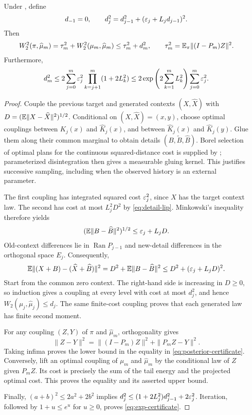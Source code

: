 \begin{theorem}\label{thm:posterior-certificate}
Under , define
\begin{equation}\label{eq:recurrence}
 d_{-1}=0,\qquad d_j^2=d_{j-1}^2+(\varepsilon_j+L_jd_{j-1})^2.
\end{equation}
Then
\begin{equation}\label{eq:posterior-certificate}
 W_2^2(\pi,\widehat\mu_m)
 =\tau_m^2+W_2^2(\mu_m,\widehat\mu_m)
 \le\tau_m^2+d_m^2,\qquad
 \tau_m^2=\mathbb E_\pi\|(I-P_m)Z\|^2.
\end{equation}
Furthermore,
\begin{equation}\label{eq:exp-certificate}
 d_m^2\le
 2\sum_{j=0}^m\varepsilon_j^2\prod_{k=j+1}^m(1+2L_k^2)
 \le2\exp\left(2\sum_{k=1}^mL_k^2\right)\sum_{j=0}^m\varepsilon_j^2.
\end{equation}
\end{theorem}
\begin{proof}
Couple the previous target and generated contexts $(X,\widehat X)$ with
$D=(\mathbb E\|X-\widehat X\|^2)^{1/2}$. Conditional on $(X,\widehat X)=(x,y)$, choose optimal couplings between $K_j(x)$ and $\widehat K_j(x)$, and between $\widehat K_j(x)$ and $\widehat K_j(y)$. Glue them along their common marginal to obtain details $(B,\widetilde B,\widehat B)$. Borel selection of optimal plans for the continuous squared-distance cost is supplied by \citet[Corollary~5.22]{villani2009}; parameterized disintegration then gives a measurable gluing kernel. This justifies successive sampling, including when the observed history is an external parameter.

The first coupling has integrated squared cost $\varepsilon_j^2$, since $X$ has the target context law. The second has cost at most $L_j^2D^2$ by \eqref{eq:detail-lip}. Minkowski's inequality therefore yields
\[
 (\mathbb E\|B-\widehat B\|^2)^{1/2}\le\varepsilon_j+L_jD.
\]
Old-context differences lie in $\operatorname{Ran}P_{j-1}$ and new-detail differences in the orthogonal space $E_j$. Consequently,
\[
 \mathbb E\|(X+B)-(\widehat X+\widehat B)\|^2
 =D^2+\mathbb E\|B-\widehat B\|^2
 \le D^2+(\varepsilon_j+L_jD)^2.
\]
Start from the common zero context. The right-hand side is increasing in $D\ge0$, so induction gives a coupling at every level with cost at most $d_j^2$, and hence $W_2(\mu_j,\widehat\mu_j)\le d_j$. The same finite-cost coupling proves that each generated law has finite second moment.

For any coupling $(Z,Y)$ of $\pi$ and $\widehat\mu_m$, orthogonality gives
\[
 \|Z-Y\|^2=\|(I-P_m)Z\|^2+\|P_mZ-Y\|^2.
\]
Taking infima proves the lower bound in the equality in \eqref{eq:posterior-certificate}. Conversely, lift an optimal coupling of $\mu_m$ and $\widehat\mu_m$ by the conditional law of $Z$ given $P_mZ$. Its cost is precisely the sum of the tail energy and the projected optimal cost. This proves the equality and its asserted upper bound.

Finally, $(a+b)^2\le2a^2+2b^2$ implies
$d_j^2\le(1+2L_j^2)d_{j-1}^2+2\varepsilon_j^2$.
Iteration, followed by $1+u\le e^u$ for $u\ge0$, proves \eqref{eq:exp-certificate}.
\end{proof}

